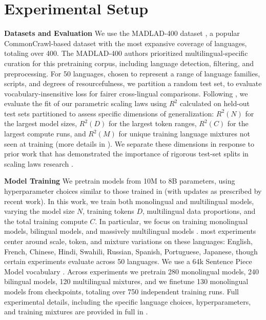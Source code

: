 \vspace{-1mm}
\section{Experimental Setup} 
\vspace{-1mm}

\noindent\textbf{Datasets and Evaluation} We use the MADLAD-400 dataset \citep{kudugunta2024madlad}, a popular CommonCrawl-based dataset with the most expansive coverage of languages, totaling over 400. 
The MADLAD-400 authors prioritized multilingual-specific curation for this pretraining corpus, including language detection, filtering, and preprocessing.
For 50 languages, chosen to represent a range of language families, scripts, and degrees of resourcefulness, we partition a random test set, to evaluate vocabulary-insensitive loss \citep{tao2024scaling} for fairer cross-lingual comparisons.
Following \citep{muennighoff2024scaling, he2024scaling}, we evaluate the fit of our parametric scaling laws using $R^2$ calculated on held-out test sets partitioned to assess specific dimensions of generalization: $R^2(N)$ for the largest model sizes, $R^2(D)$ for the largest token ranges, $R^2(C)$ for the largest compute runs, and $R^2(M)$ for unique training language mixtures not seen at training (more details in ).
We separate these dimensions in response to prior work that has demonstrated the importance of rigorous test-set splits in scaling laws research \citep{li2025mis}.


\noindent\textbf{Model Training} We pretrain models from 10M to 8B parameters, using hyperparameter choices similar to those trained in \citet{kudugunta2024madlad} (with updates as prescribed by recent work). 
In this work, we train both monolingual and multilingual models, varying the model size $N$, training tokens $D$, multilingual data proportions, and the total training compute $C$. 
In particular, we focus on training monolingual models, bilingual models, and massively multilingual \unimax{} models \citep{chung2023unimax}.
most experiments center around scale, token, and mixture variations on these languages: English, French, Chinese, Hindi, Swahili, Russian, Spanish, Portuguese, Japanese, though certain experiments evaluate across 50 languages. 
We use a 64k Sentence Piece Model vocabulary \citep{kudo2018sentencepiece}.
Across experiments we pretrain 280 monolingual models, 240 bilingual models, 120 multilingual mixtures, and we finetune 130 monolingual models from \unimax{} checkpoints, totaling over 750 independent training runs.
Full experimental details, including the specific language choices, hyperparameters, and training mixtures are provided in full in .
